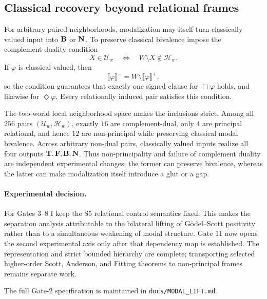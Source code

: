 \subsection{Classical recovery beyond relational frames}

For arbitrary paired neighborhoods, modalization may itself turn classically valued input into \(\mathbf{B}\) or \(\mathbf{N}\). To preserve classical bivalence impose the complement-duality condition
\[
  X\in\mathcal U_w
  \quad\Longleftrightarrow\quad
  W\setminus X\notin\mathcal H_w.
\]
If \(\varphi\) is classical-valued, then
\[
  \llbracket\varphi\rrbracket^{-}
  =W\setminus\llbracket\varphi\rrbracket^{+},
\]
so the condition guarantees that exactly one signed clause for \(\Box\varphi\) holds, and likewise for \(\Diamond\varphi\). Every relationally induced pair satisfies this condition.

The two-world local neighborhood space makes the inclusions strict. Among all \(256\) pairs \((\mathcal U_w,\mathcal H_w)\), exactly \(16\) are complement-dual, only \(4\) are principal relational, and hence \(12\) are non-principal while preserving classical modal bivalence. Across arbitrary non-dual pairs, classically valued inputs realize all four outputs \(\mathbf{T},\mathbf{F},\mathbf{B},\mathbf{N}\). Thus non-principality and failure of complement duality are independent experimental changes: the former can preserve bivalence, whereas the latter can make modalization itself introduce a glut or a gap.

\paragraph{Experimental decision.}
For Gates 3--8 I keep the S5 relational control semantics fixed. This makes the separation analysis attributable to the bilateral lifting of G\"odel--Scott positivity rather than to a simultaneous weakening of modal structure. Gate 11 now opens the second experimental axis only after that dependency map is established. The representation and strict bounded hierarchy are complete; transporting selected higher-order Scott, Anderson, and Fitting theorems to non-principal frames remains separate work.

The full Gate-2 specification is maintained in \texttt{docs/MODAL\_LIFT.md}.
